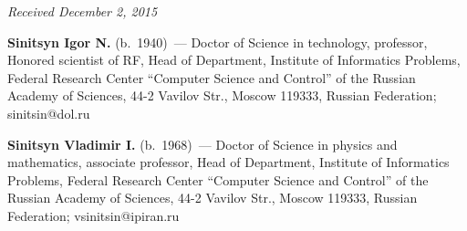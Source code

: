 \vspace*{-3pt}

\hfill{\small\textit{Received December 2, 2015}}

\Contr

\noindent
\textbf{Sinitsyn Igor N.} (b.\ 1940)~---
Doctor of Science in technology, professor,
Honored scientist of RF, Head of Department, Institute of Informatics Problems, Federal Research Center ``Computer Science and
Control'' of the Russian Academy of Sciences, 44-2 Vavilov Str.,
Moscow 119333, Russian Federation; sinitsin@dol.ru

\vspace*{3pt}

\noindent
\textbf{Sinitsyn Vladimir I.} (b.\ 1968)~---
 Doctor of Science in physics and mathematics,
associate professor, Head of Department, Institute of Informatics Problems, Federal Research Center ``Computer Science and
Control'' of the Russian Academy of Sciences, 44-2 Vavilov Str.,
Moscow 119333, Russian Federation; vsinitsin@ipiran.ru

\label{end\stat}


\renewcommand{\bibname}{\protect\rm Литература}